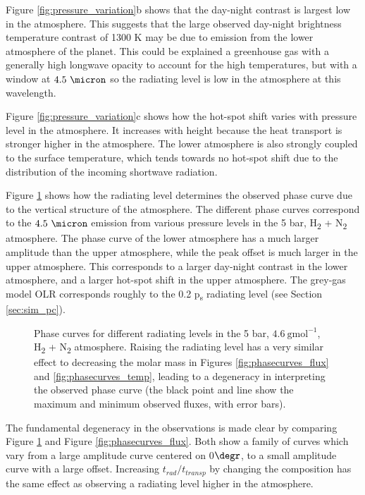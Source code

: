 Figure \ref{fig:pressure_variation}b shows that the day-night contrast is largest low in the atmosphere. This suggests that the large observed day-night brightness temperature contrast of 1300 K may be due to emission from the lower atmosphere of the planet. This could be explained a greenhouse gas with a generally high longwave opacity to account for the high temperatures, but with a window at $4.5\ \micron$ so the radiating level is low in the atmosphere at this wavelength.

Figure \ref{fig:pressure_variation}c shows how the hot-spot shift varies with pressure level in the atmosphere. It increases with height because the heat transport is stronger higher in the atmosphere. The lower atmosphere is also strongly coupled to the surface temperature, which tends towards no hot-spot shift due to the distribution of the incoming shortwave radiation.

Figure \ref{fig:phasecurves} shows how the radiating level determines the observed phase curve due to the vertical structure of the atmosphere. The different phase curves correspond to the $4.5\ \micron$ emission from various pressure levels in the 5 bar, H\textsubscript{2} + N\textsubscript{2} atmosphere. The phase curve of the lower atmosphere has a much larger amplitude than the upper atmosphere, while the peak offset is much larger in the upper atmosphere. This corresponds to a larger day-night contrast in the lower atmosphere, and a larger hot-spot shift in the upper atmosphere. The grey-gas model OLR corresponds roughly to the 0.2 p\textsubscript{s} radiating level (see Section \ref{sec:sim_pc}).

\begin{figure}
\caption{Phase curves for different radiating levels in the 5 bar, $4.6\ \mathrm{gmol}^{-1}$,  H\textsubscript{2} + N\textsubscript{2} atmosphere. Raising the radiating level has a very similar effect to decreasing the molar mass in Figures \ref{fig:phasecurves_flux} and \ref{fig:phasecurves_temp}, leading to a degeneracy in interpreting the observed phase curve (the black point and line show the maximum and minimum observed fluxes, with error bars).\label{fig:phasecurves}}
\end{figure}

The fundamental degeneracy in the observations is made clear by comparing Figure \ref{fig:phasecurves} and Figure \ref{fig:phasecurves_flux}. Both show a family of curves which vary from a large amplitude curve centered on 0$\degr$, to a small amplitude curve with a large offset. Increasing $t_{rad}/t_{transp}$ by changing the composition has the same effect as observing a radiating level higher in the atmosphere.

